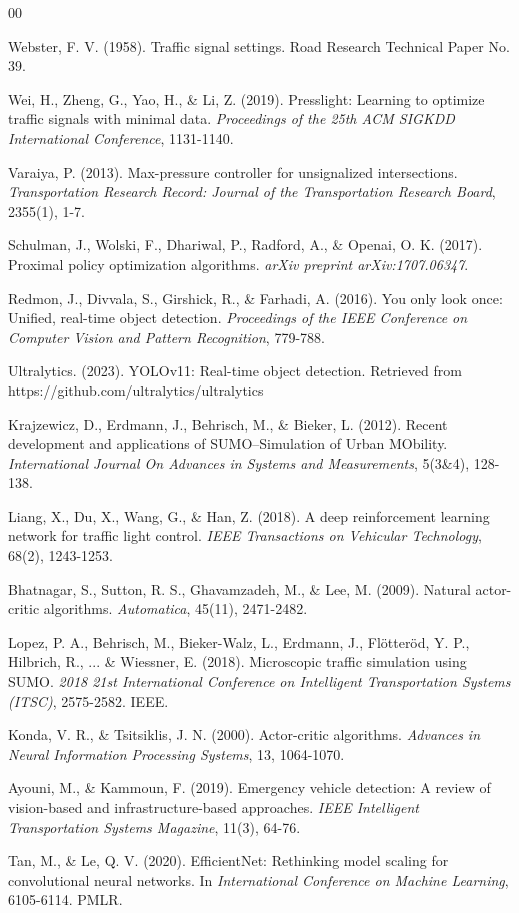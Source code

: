 \documentclass[10pt,conference]{IEEEtran}
\begin{document}
\begin{thebibliography}{00}

 Webster, F. V. (1958). Traffic signal settings. Road Research Technical Paper No. 39.

 Wei, H., Zheng, G., Yao, H., \& Li, Z. (2019). Presslight: Learning to optimize traffic signals with minimal data. \textit{Proceedings of the 25th ACM SIGKDD International Conference}, 1131-1140.

 Varaiya, P. (2013). Max-pressure controller for unsignalized intersections. \textit{Transportation Research Record: Journal of the Transportation Research Board}, 2355(1), 1-7.

 Schulman, J., Wolski, F., Dhariwal, P., Radford, A., \& Openai, O. K. (2017). Proximal policy optimization algorithms. \textit{arXiv preprint arXiv:1707.06347}.

 Redmon, J., Divvala, S., Girshick, R., \& Farhadi, A. (2016). You only look once: Unified, real-time object detection. \textit{Proceedings of the IEEE Conference on Computer Vision and Pattern Recognition}, 779-788.

 Ultralytics. (2023). YOLOv11: Real-time object detection. Retrieved from https://github.com/ultralytics/ultralytics

 Krajzewicz, D., Erdmann, J., Behrisch, M., \& Bieker, L. (2012). Recent development and applications of SUMO--Simulation of Urban MObility. \textit{International Journal On Advances in Systems and Measurements}, 5(3\&4), 128-138.

 Liang, X., Du, X., Wang, G., \& Han, Z. (2018). A deep reinforcement learning network for traffic light control. \textit{IEEE Transactions on Vehicular Technology}, 68(2), 1243-1253.

 Bhatnagar, S., Sutton, R. S., Ghavamzadeh, M., \& Lee, M. (2009). Natural actor-critic algorithms. \textit{Automatica}, 45(11), 2471-2482.

 Lopez, P. A., Behrisch, M., Bieker-Walz, L., Erdmann, J., Flötteröd, Y. P., Hilbrich, R., ... \& Wiessner, E. (2018). Microscopic traffic simulation using SUMO. \textit{2018 21st International Conference on Intelligent Transportation Systems (ITSC)}, 2575-2582. IEEE.

 Konda, V. R., \& Tsitsiklis, J. N. (2000). Actor-critic algorithms. \textit{Advances in Neural Information Processing Systems}, 13, 1064-1070.

 Ayouni, M., \& Kammoun, F. (2019). Emergency vehicle detection: A review of vision-based and infrastructure-based approaches. \textit{IEEE Intelligent Transportation Systems Magazine}, 11(3), 64-76.

 Tan, M., \& Le, Q. V. (2020). EfficientNet: Rethinking model scaling for convolutional neural networks. In \textit{International Conference on Machine Learning}, 6105-6114. PMLR.

\end{thebibliography}
\end{document}
